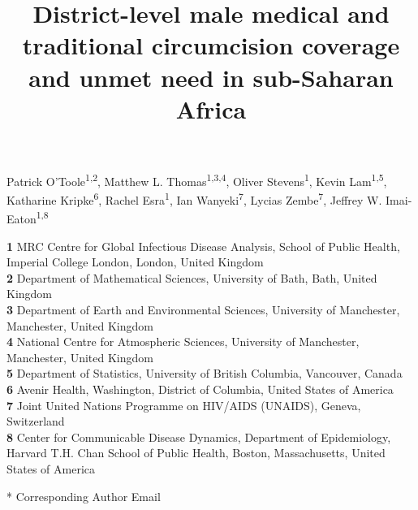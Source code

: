\documentclass{article}
\title{District-level male medical and traditional circumcision coverage and unmet need in sub-Saharan Africa}
\author{}
\date{}
\begin{document}

\maketitle

\vspace{-1cm}

Patrick O'Toole\textsuperscript{1,2},
Matthew L. Thomas\textsuperscript{1,3,4},
Oliver Stevens\textsuperscript{1},
Kevin Lam\textsuperscript{1,5},
Katharine Kripke\textsuperscript{6},
Rachel Esra\textsuperscript{1},
Ian Wanyeki\textsuperscript{7},
Lycias Zembe\textsuperscript{7},
Jeffrey W. Imai-Eaton\textsuperscript{1,8} \\
\smallskip

\textbf{1} MRC Centre for Global Infectious Disease Analysis, School of Public Health, Imperial College London, London, United Kingdom\\
\textbf{2} Department of Mathematical Sciences, University of Bath, Bath, United Kingdom\\
\textbf{3} Department of Earth and Environmental Sciences, University of Manchester, Manchester, United Kingdom\\
\textbf{4} National Centre for Atmospheric Sciences, University of Manchester, Manchester, United Kingdom\\
\textbf{5} Department of Statistics, University of British Columbia, Vancouver, Canada\\
\textbf{6} Avenir Health, Washington, District of Columbia, United States of America\\
\textbf{7} Joint United Nations Programme on HIV/AIDS (UNAIDS), Geneva, Switzerland\\
\textbf{8} Center for Communicable Disease Dynamics, Department of Epidemiology, Harvard T.H. Chan School of Public Health, Boston, Massachusetts, United States of America\\

\smallskip

* Corresponding Author Email

\clearpage
\end{document}

